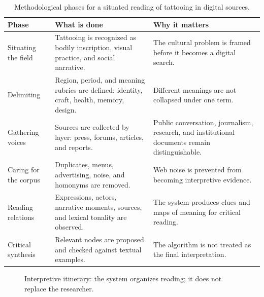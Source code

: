 \documentclass[11pt]{article}
\begin{document}
\begin{table}[H]
\centering
\small
\begin{tabular}{L{0.18\textwidth}L{0.35\textwidth}L{0.37\textwidth}}
\toprule
\textbf{Phase} & \textbf{What is done} & \textbf{Why it matters} \\
\midrule
Situating the field & Tattooing is recognized as bodily inscription, visual practice, and social narrative. &
The cultural problem is framed before it becomes a digital search. \\
\addlinespace
Delimiting & Region, period, and meaning rubrics are defined: identity, craft, health, memory, design. &
Different meanings are not collapsed under one term. \\
\addlinespace
Gathering voices & Sources are collected by layer: press, forums, articles, and reports. &
Public conversation, journalism, research, and institutional documents remain distinguishable. \\
\addlinespace
Caring for the corpus & Duplicates, menus, advertising, noise, and homonyms are removed. &
Web noise is prevented from becoming interpretive evidence. \\
\addlinespace
Reading relations & Expressions, actors, narrative moments, sources, and lexical tonality are observed. &
The system produces clues and maps of meaning for critical reading. \\
\addlinespace
Critical synthesis & Relevant nodes are proposed and checked against textual examples. &
The algorithm is not treated as the final interpretation. \\
\bottomrule
\end{tabular}
\caption{Methodological phases for a situated reading of tattooing in digital sources.}
\label{tab:phases-en}
\end{table}

\begin{figure}[H]
\centering
{}
\caption{Interpretive itinerary: the system organizes reading; it does not replace the researcher.}
\label{fig:phases-en}
\end{figure}
\end{document}
